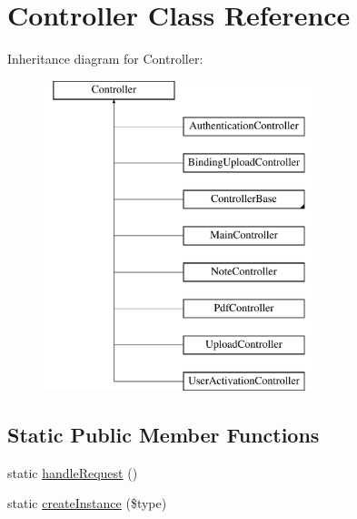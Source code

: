 \hypertarget{classController}{
\section{Controller Class Reference}
\label{classController}
}
Inheritance diagram for Controller:\begin{figure}[H]
\begin{center}
\leavevmode
\includegraphics[height=9.000000cm]{classController}
\end{center}
\end{figure}
\subsection*{Static Public Member Functions}
\begin{DoxyCompactItemize}
\item 
static \hyperlink{classController_a772b295e218a0ae1b1614239a441baee}{handleRequest} ()
\item 
static \hyperlink{classController_aafbd169c4ea409841c28d01db9081c83}{createInstance} (\$type)
\end{DoxyCompactItemize}
